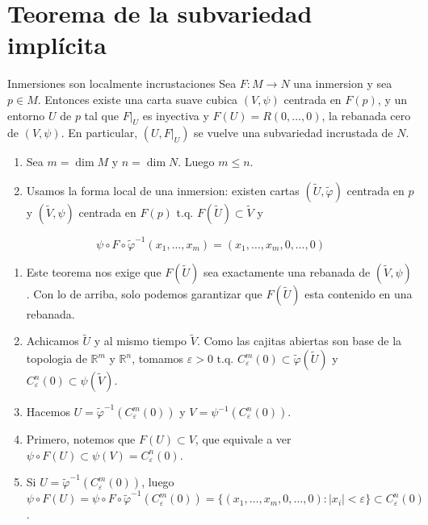 \chapter{Teorema de la subvariedad implícita}
\label{ch:teo-13}
\begin{bookproposition}{Inmersiones son localmente incrustaciones}
Sea $F:M\to N$ una inmersion y sea $p\in M$. Entonces existe una carta suave cubica $(V,\psi)$ centrada en $F(p)$, y un entorno $U$ de $p$ tal que $F|_U$ es inyectiva y $F(U)=R(0,\ldots,0)$, la rebanada cero de $(V,\psi)$. En particular, $(U,F|_U)$ se vuelve una subvariedad incrustada de $N$.

\end{bookproposition}
\begin{bookproof}{}
\begin{enumerate}
\item Sea $m=\dim M$ y $n=\dim N$. Luego $m\le n$.
\item Usamos la forma local de una inmersion: existen cartas $(\widetilde U,\widetilde\varphi)$ centrada en $p$ y $(\widetilde V,\psi)$ centrada en $F(p)$ t.q. $F(\widetilde U)\subset\widetilde V$ y
\end{enumerate}
\[
\psi\circ F\circ\widetilde\varphi^{-1}(x_1,\ldots,x_m)=(x_1,\ldots,x_m,0,\ldots,0)
\]
\begin{enumerate}[start=3]
\item Este teorema nos exige que $F(\widetilde U)$ sea exactamente una rebanada de $(\widetilde V,\psi)$. Con lo de arriba, solo podemos garantizar que $F(\widetilde U)$ esta contenido en una rebanada.
\item Achicamos $\widetilde U$ y al mismo tiempo $\widetilde V$. Como las cajitas abiertas son base de la topologia de $\mathbb R^m$ y $\mathbb R^n$, tomamos $\varepsilon>0$ t.q. $C_\varepsilon^m(0)\subset\widetilde\varphi(\widetilde U)$ y $C_\varepsilon^n(0)\subset\psi(\widetilde V)$.
\item Hacemos $U=\widetilde\varphi^{-1}(C_\varepsilon^m(0))$ y $V=\psi^{-1}(C_\varepsilon^n(0))$.
\item Primero, notemos que $F(U)\subset V$, que equivale a ver $\psi\circ F(U)\subset\psi(V)=C_\varepsilon^n(0)$.
\item Si $U=\widetilde\varphi^{-1}(C_\varepsilon^m(0))$, luego $\psi\circ F(U)=\psi\circ F\circ\widetilde\varphi^{-1}(C_\varepsilon^m(0))=\{(x_1,\ldots,x_m,0,\ldots,0):|x_i|<\varepsilon\}\subset C_\varepsilon^n(0)$.

\end{enumerate}
\end{bookproof}
